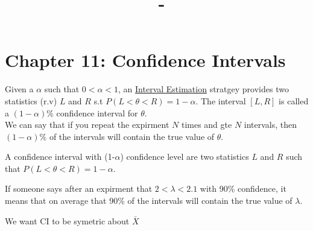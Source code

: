 \documentclass[answers,12pt,addpoints]{exam}
\author{\name}
\title{\course \ - \assignment}
\begin{document}
\maketitle
\section{Chapter 11: Confidence Intervals}
Given a $\alpha$ such that $0 < \alpha < 1$, an \underline{Interval Estimation} stratgey provides two statistics (r.v) $L$ and $R$ s.t $P(L < \theta < R) = 1 - \alpha$. The interval $[L, R]$ is called a $(1-\alpha)\%$ confidence interval for $\theta$.\\
We can say that if you repeat the expirment $N$ times and gte $N$ intervals, then $(1-\alpha)\%$ of the intervals will contain the true value of $\theta$.\\
\begin{definition}
    A confidence interval with (1-$\alpha$) confidence level are two statistics $L$ and $R$ such that $P(L < \theta < R) = 1 - \alpha$.
\end{definition}
\begin{remark}
    If someone says after an expirment that $2 < \lambda < 2.1$ with 90\% confidence, it means that on average that 90\% of the intervals will contain the true value of $\lambda$.
\end{remark}
We want CI to be symetric about $\bar{X}$ 
\end{document}
